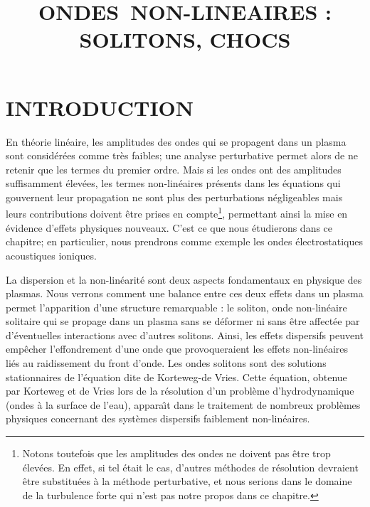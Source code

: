 \documentclass[10pt,thmsa]{article}
\title{ONDES\ NON-LINEAIRES : SOLITONS, CHOCS}
\author{

}
\begin{document}
\maketitle
\tableofcontents%

\newpage


\section{INTRODUCTION}

En th\'{e}orie lin\'{e}aire, les amplitudes des ondes qui se propagent dans un
plasma sont consid\'{e}r\'{e}es comme tr\`{e}s faibles; une analyse
perturbative permet alors de ne retenir que les termes du premier ordre. Mais
si les ondes ont des amplitudes suffisamment \'{e}lev\'{e}es, les termes
non-lin\'{e}aires pr\'{e}sents dans les \'{e}quations qui gouvernent leur
propagation ne sont plus des perturbations n\'{e}gligeables mais leurs
contributions doivent \^{e}tre prises en compte\footnote{Notons toutefois que
les amplitudes des ondes ne doivent pas \^{e}tre trop \'{e}lev\'{e}es. En
effet, si tel \'{e}tait le cas, d'autres m\'{e}thodes de r\'{e}solution
devraient \^{e}tre substitu\'{e}es \`{a} la m\'{e}thode perturbative, et nous
serions dans le domaine de la turbulence forte qui n'est pas notre propos dans
ce chapitre.}, permettant ainsi la mise en \'{e}vidence d'effets physiques
nouveaux. C'est ce que nous \'{e}tudierons dans ce chapitre; en particulier,
nous prendrons comme exemple les ondes \'{e}lectrostatiques acoustiques ioniques.

La dispersion et la non-lin\'{e}arit\'{e} sont deux aspects fondamentaux en
physique des plasmas. Nous verrons comment une balance entre ces deux effets
dans un plasma permet l'apparition d'une structure remarquable : le soliton,
onde non-lin\'{e}aire solitaire qui se propage dans un plasma sans se
d\'{e}former ni sans \^{e}tre affect\'{e}e par d'\'{e}ventuelles interactions
avec d'autres solitons. Ainsi, les effets dispersifs peuvent emp\^{e}cher
l'effondrement d'une onde que provoqueraient les effets non-lin\'{e}aires
li\'{e}s au raidissement du front d'onde. Les ondes solitons sont des
solutions stationnaires de l'\'{e}quation dite de Korteweg-de Vries. Cette
\'{e}quation, obtenue par Korteweg et de Vries lors de la r\'{e}solution d'un
probl\`{e}me d'hydrodynamique (ondes \`{a} la surface de l'eau), appara\^{\i}t
dans le traitement de nombreux probl\`{e}mes physiques concernant des
syst\`{e}mes dispersifs faiblement non-lin\'{e}aires.
\end{document}
